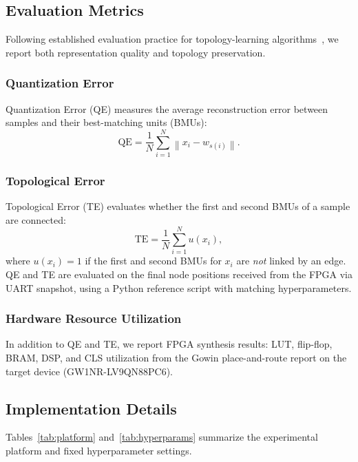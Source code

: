 \documentclass[conference]{IEEEtran}
\begin{document}
\subsection{Evaluation Metrics}
Following established evaluation practice for topology-learning algorithms~\cite{martinetz1994topology,fritzke1994growing}, we report both representation quality and topology preservation.

\subsubsection{Quantization Error}
Quantization Error (QE) measures the average reconstruction error between samples and their best-matching units (BMUs):
\begin{equation}
\mathrm{QE}=\frac{1}{N}\sum_{i=1}^{N}\left\lVert x_i-w_{s(i)}\right\rVert .
\end{equation}

\subsubsection{Topological Error}
Topological Error (TE) evaluates whether the first and second BMUs of a sample are connected:
\begin{equation}
\mathrm{TE}=\frac{1}{N}\sum_{i=1}^{N} u(x_i),
\end{equation}
where $u(x_i)=1$ if the first and second BMUs for $x_i$ are \emph{not} linked by an edge. QE and TE are evaluated on the final node positions received from the FPGA via UART snapshot, using a Python reference script with matching hyperparameters.

\subsubsection{Hardware Resource Utilization}
In addition to QE and TE, we report FPGA synthesis results: LUT, flip-flop, BRAM, DSP, and CLS utilization from the Gowin place-and-route report on the target device (GW1NR-LV9QN88PC6).

\subsection{Implementation Details}
Tables~\ref{tab:platform} and~\ref{tab:hyperparams} summarize the experimental platform and fixed hyperparameter settings.
\end{document}
